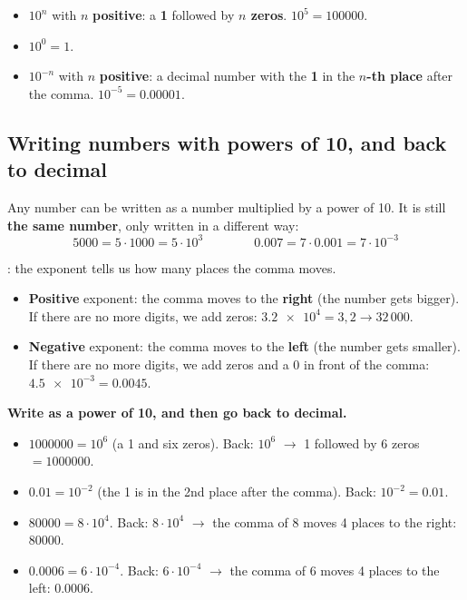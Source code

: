 \begin{impt}
    \begin{itemize}
        \item \(10^{n}\) with \(n\) \textbf{positive}: a \textbf{1} followed by \textbf{\(n\) zeros}. \quad \(10^{5} = \num{100000}\).
        \item \(10^{0} = 1\).
        \item \(10^{-n}\) with \(n\) \textbf{positive}: a decimal number with the \textbf{1} in the \textbf{\(n\)-th place} after the comma. \quad \(10^{-5} = \num{0.00001}\).
    \end{itemize}
\end{impt}

\subsection{Writing numbers with powers of 10, and back to decimal}

Any number can be written as a number multiplied by a power of 10. It is still \textbf{the same number}, only written in a different way:
\begin{equation*}
    \num{5000} = 5 \cdot \num{1000} = 5 \cdot 10^{3}
    \qquad\qquad
    \num{0.007} = 7 \cdot \num{0.001} = 7 \cdot 10^{-3}
\end{equation*}

: the exponent tells us how many places the comma moves.
\begin{itemize}
    \item \textbf{Positive} exponent: the comma moves to the \textbf{right} (the number gets bigger). If there are no more digits, we add zeros: \(\num{3.2e4} = 3{,}2 \to 32\,000\).
    \item \textbf{Negative} exponent: the comma moves to the \textbf{left} (the number gets smaller). If there are no more digits, we add zeros and a 0 in front of the comma: \(\num{4.5e-3} = \num{0.0045}\).
\end{itemize}

\begin{example}
    \textbf{Write as a power of 10, and then go back to decimal.}
    \begin{itemize}
        \item \(\num{1000000} = 10^{6}\) (a 1 and six zeros). Back: \(10^{6}\) \(\to\) 1 followed by 6 zeros \(= \num{1000000}\).
        \item \(\num{0.01} = 10^{-2}\) (the 1 is in the 2nd place after the comma). Back: \(10^{-2} = \num{0.01}\).
        \item \(\num{80000} = 8 \cdot 10^{4}\). Back: \(8 \cdot 10^{4}\) \(\to\) the comma of 8 moves 4 places to the right: \(\num{80000}\).
        \item \(\num{0.0006} = 6 \cdot 10^{-4}\). Back: \(6 \cdot 10^{-4}\) \(\to\) the comma of 6 moves 4 places to the left: \(\num{0.0006}\).
    \end{itemize}
\end{example}

